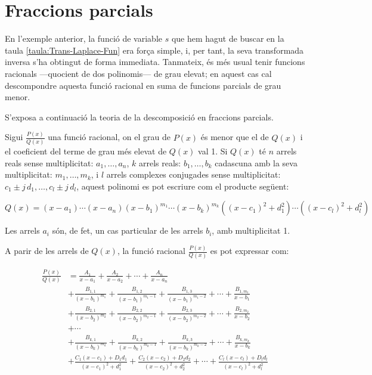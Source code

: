 \section{Fraccions parcials}

En l'exemple anterior, la funció de variable $s$ que hem hagut de
buscar en la taula \vref{taula:Trans-Laplace-Fun} era força simple, i, per tant, la seva transformada inversa s'ha obtingut de forma
immediata. Tanmateix, és més usual tenir funcions racionals ---quocient de dos polinomis--- de grau elevat; en aquest cas cal
descompondre aquesta funció racional en suma de funcions parcials de
grau menor.

S'exposa a continuació la teoria de la descomposició en fraccions
parcials.

Sigui $\frac{P(x)}{Q(x)}$ una funció racional, on el grau de $P(x)$
és menor que el de $Q(x)$ i el coeficient del terme de grau més
elevat de $Q(x)$ val 1. Si $Q(x)$ té $n$ arrels reals sense
multiplicitat: $a_1,\ldots,a_n$, $k$ arrels reals: $b_1,\ldots,b_k$
cadascuna amb la seva multiplicitat: $m_1,\ldots,m_k$, i $l$ arrels
complexes conjugades sense multiplicitat: $c_1\pm
j\,d_1,\ldots,c_l\pm j\,d_l$, aquest polinomi es pot escriure
com el producte següent:

\begin{equation}
    Q(x)= (x-a_1) \cdots (x-a_n)(x-b_1)^{m_1} \cdots (x-b_k)^{m_k}
    ((x-c_1)^2+d_1^2)\cdots((x-c_l)^2+d_l^2)
\end{equation}

Les arrels $a_i$ són, de fet, un cas particular de les arrels $b_i$,
amb multiplicitat 1.

A parir de les arrels de $Q(x)$, la funció  racional
$\frac{P(x)}{Q(x)}$ es pot expressar com:

\begin{equation}\begin{split}
    \frac{P(x)}{Q(x)} &= \frac{A_1}{x-a_1} + \frac{A_2}{x-a_2}
    + \cdots + \frac{A_n}{x-a_n}  \\[1.5ex]
   &+ \frac{B_{1,1}}{(x-b_1)^{m_1}} + \frac{B_{1,2}}{(x-b_1)^{m_1-1}}
   + \frac{B_{1,3}}{(x-b_1)^{m_1-2}} + \cdots +
   \frac{B_{1,m_1}}{x-b_1} \\[1.5ex]
&+ \frac{B_{2,1}}{(x-b_2)^{m_2}} + \frac{B_{2,2}}{(x-b_2)^{m_2-1}}
   + \frac{B_{2,3}}{(x-b_2)^{m_2-2}} + \cdots  +
   \frac{B_{2,m_2}}{x-b_2} \\[1.5ex]
   &+ \cdots \\[1ex]
&+ \frac{B_{k,1}}{(x-b_k)^{m_k}} + \frac{B_{k,2}}{(x-b_k)^{m_k-1}}
   + \frac{B_{k,3}}{(x-b_k)^{m_k-2}} + \cdots +
   \frac{B_{k,m_k}}{x-b_k}\\[1.5ex]
&+ \frac{C_1(x-c_1)+D_1 d_1}{(x-c_1)^2+d_1^2}+ \frac{C_2(x-c_2)+D_2
d_2}{(x-c_2)^2+d_2^2} +  \cdots +\frac{C_l(x-c_l)+D_l d_l}{(x-c_l)^2+d_l^2}\\[1.5ex]
\end{split}\end{equation}

